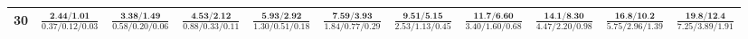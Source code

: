 \documentclass{slides}
\begin{document}
{{{\begin{tabular}{|c|c|c|c|c|c|c|c|c|c|c|}
\hline
30 & $\frac{\textbf{2.44/1.01}}{0.37/0.12/0.03}$ & $\frac{\textbf{3.38/1.49}}{0.58/0.20/0.06}$ & $\frac{\textbf{4.53/2.12}}{0.88/0.33/0.11}$ & $\frac{\textbf{5.93/2.92}}{1.30/0.51/0.18}$ & $\frac{\textbf{7.59/3.93}}{1.84/0.77/0.29}$ & $\frac{\textbf{9.51/5.15}}{2.53/1.13/0.45}$ & $\frac{\textbf{11.7/6.60}}{3.40/1.60/0.68}$ & $\frac{\textbf{14.1/8.30}}{4.47/2.20/0.98}$ & $\frac{\textbf{16.8/10.2}}{5.75/2.96/1.39}$ & $\frac{\textbf{19.8/12.4}}{7.25/3.89/1.91}$ \\
\hline
\end{tabular}}}}
\end{document}
